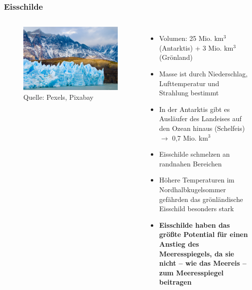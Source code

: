 \begin{frame}
	\frametitle{Eisschilde}
  \begin{columns}
    \begin{figure}
      \centering
      \includegraphics[trim=0 0 0.69\imagewidth{} 0, clip, width = 0.8\linewidth]{bilder/panoramic-view-of-landscape-against-sky-255329.jpg}
      \caption{Quelle: Pexels, Pixabay}
    \end{figure}
	\begin{itemize}
		\item Volumen: 25 Mio. km$^3$ (Antarktis) + 3 Mio. km$^3$ (Grönland)
		\item Masse ist durch Niederschlag, Lufttemperatur und Strahlung bestimmt
		\item In der Antarktis gibt es Ausläufer des Landeises auf den Ozean hinaus (Schelfeis) $\rightarrow$ 0,7 Mio. km$^3$
		\item Eisschilde schmelzen an randnahen Bereichen
		\item Höhere Temperaturen im Nordhalbkugelsommer gefährden das grönländische Eisschild besonders stark
		\item \textbf{Eisschilde haben das größte Potential für einen Anstieg des Meeresspiegels, da sie nicht -- wie das Meereis -- zum Meeresspiegel beitragen}
	\end{itemize}
  \end{columns}


\end{frame}
